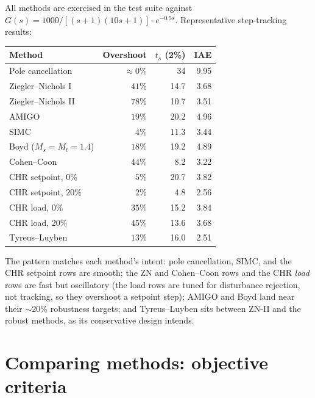 \documentclass[11pt]{article}
\begin{document}
All methods are exercised in the test suite against
$G(s) = 1000 / [(s+1)(10s+1)]\cdot e^{-0.5s}$. Representative step-tracking
results:

\begin{center}
\renewcommand{\arraystretch}{1.25}
\begin{tabular}{l r r r}
\toprule
\textbf{Method} & \textbf{Overshoot} & \textbf{$t_s$ (2\%)} & \textbf{IAE}\\
\midrule
Pole cancellation        & $\approx 0\%$  & 34   & 9.95\\
Ziegler--Nichols I       & $41\%$         & 14.7 & 3.68\\
Ziegler--Nichols II      & $78\%$         & 10.7 & 3.51\\
AMIGO                    & $19\%$         & 20.2 & 4.96\\
SIMC                     & $4\%$          & 11.3 & 3.44\\
Boyd ($M_s=M_t=1.4$)     & $18\%$         & 19.2 & 4.89\\
Cohen--Coon              & $44\%$         & 8.2  & 3.22\\
CHR setpoint, $0\%$      & $5\%$          & 20.7 & 3.82\\
CHR setpoint, $20\%$     & $2\%$          & 4.8  & 2.56\\
CHR load, $0\%$          & $35\%$         & 15.2 & 3.84\\
CHR load, $20\%$         & $45\%$         & 13.6 & 3.68\\
Tyreus--Luyben           & $13\%$         & 16.0 & 2.51\\
\bottomrule
\end{tabular}
\end{center}

The pattern matches each method's intent: pole cancellation, SIMC, and the CHR
setpoint rows are smooth; the ZN and Cohen--Coon rows and the CHR \emph{load}
rows are fast but oscillatory (the load rows are tuned for disturbance
rejection, not tracking, so they overshoot a setpoint step); AMIGO and Boyd
land near their $\sim 20\%$ robustness targets; and Tyreus--Luyben sits between
ZN-II and the robust methods, as its conservative design intends.

\section{Comparing methods: objective criteria}
\end{document}
